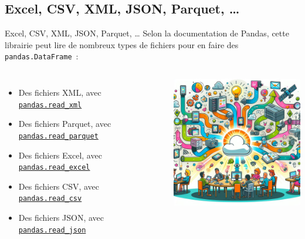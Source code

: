 \documentclass{beamer}
\begin{document}
    \subsection{Excel, CSV, XML, JSON, Parquet, \ldots}
    \begin{frame}{Excel, CSV, XML, JSON, Parquet, \ldots}
        Selon la documentation de Pandas, cette librairie peut lire de nombreux types de fichiers pour en faire des \lstinline{pandas.DataFrame}~:
        \begin{columns}
            \begin{itemize}
                \item Des fichiers XML, avec \href{https://pandas.pydata.org/docs/reference/api/pandas.read_xml.html}{\lstinline{pandas.read_xml}}
                \item Des fichiers Parquet, avec \href{https://pandas.pydata.org/docs/reference/api/pandas.read_parquet.html}{\lstinline{pandas.read_parquet}}
                \item Des fichiers Excel, avec \href{https://pandas.pydata.org/docs/reference/api/pandas.read_excel.html}{\lstinline{pandas.read_excel}}
                \item Des fichiers CSV, avec \href{https://pandas.pydata.org/docs/reference/api/pandas.read_csv.html}{\lstinline{pandas.read_csv}}
                \item Des fichiers JSON, avec \href{https://pandas.pydata.org/docs/reference/api/pandas.read_json.html}{\lstinline{pandas.read_json}}
            \end{itemize}
            \centering
            \includegraphics[width=7cm]{image/data-from-everywhere}
        \end{columns}
    \end{frame}
\end{document}
